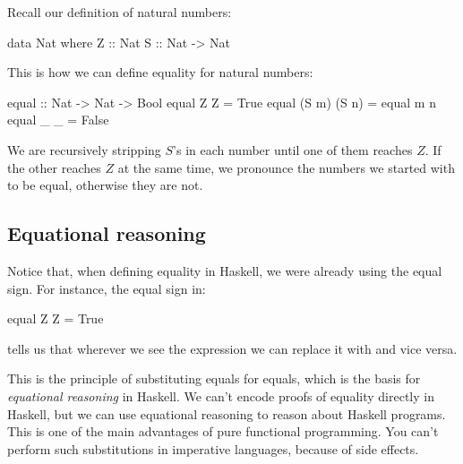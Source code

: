 \documentclass[DaoFP]{subfiles}
\begin{document}
Recall our definition of natural numbers:
\begin{haskell}
data Nat where
  Z :: Nat
  S :: Nat -> Nat
\end{haskell}
This is how we can define equality for natural numbers:
\begin{haskell}
equal :: Nat -> Nat -> Bool
equal Z Z = True
equal (S m) (S n) = equal m n
equal _ _ = False
\end{haskell}
We are recursively stripping $S$'s in each number until one of them reaches $Z$. If the other reaches $Z$ at the same time, we pronounce the numbers we started with to be equal, otherwise they are not. 

\subsection{Equational reasoning}

Notice that, when defining equality in Haskell, we were already using the equal sign. For instance, the equal sign in:
\begin{haskell}
equal Z Z = True
\end{haskell}
tells us that wherever we see the expression  we can replace it with  and vice versa. 

This is the principle of substituting equals for equals, which is the basis for \emph{equational reasoning} in Haskell. We can't encode proofs of equality directly in Haskell, but we can use equational reasoning to reason about Haskell programs. This is one of the main advantages of pure functional programming. You can't perform such substitutions in imperative languages, because of side effects.
\end{document}
